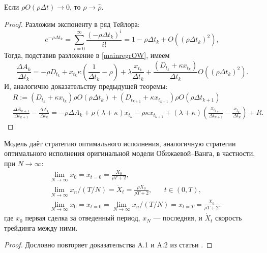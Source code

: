 \begin{appendices}
	\begin{theorem}\label{lilreg}
		Если $\rho O(\rho \Delta t) \rightarrow 0$, то $\rho \rightarrow \hat \rho$.
	\end{theorem}
	\begin{proof}
		Разложим экспоненту в ряд Тейлора:
		\begin{equation*}
			e^{- \rho \Delta t_k} = \sum_{i=0}^{\infty} \frac{(-\rho \Delta t_k)^i}{i!} = 1 - \rho \Delta t_k + O((\rho \Delta t_k)^2),
		\end{equation*}
		Тогда, подставив разложение в \eqref{mainregrOW}, имеем
		\begin{equation*}
			\frac{\Delta A_k}{\Delta t_k} = - \rho D_{t_k}
			+ x_{t_k}  \kappa (\frac{1}{\Delta t_k} -  \rho) + \lambda  \frac{x_{t_k}}{\Delta t_k}
			+ \frac{(D_{t_k} + \kappa x_{t_k})}{\Delta t_k} O((\rho \Delta t_k)^2).
		\end{equation*}
		И, аналогично доказательству предыдущей теоремы:
		\begin{align*}
			 & R := (D_{t_k} + \kappa x_{t_k}) \rho O(\rho \Delta t_k) + (D_{t_{k+1}} + \kappa x_{t_{k+1}}) \rho O(\rho \Delta t_{k+1})                                 \\
			 & \frac{\Delta A_{k+1}}{\Delta t_{k+1}} - \frac{\Delta A_{k}}{\Delta t_{k}} = -\rho \Delta A_k + \rho (\lambda + \kappa) x_{t_k} - \rho \kappa x_{t_{k+1}}
			+ (\lambda + \kappa) \left(\frac{x_{t_{k+1}}}{\Delta t_{k+1}} - \frac{x_{t_k}}{\Delta t_{k}}\right) + R.
		\end{align*}
	\end{proof}

	\begin{theorem}
		Модель даёт стратегию оптимального исполнения, аналогичную стратегии оптимального исполнения
		оригинальной модели Обижаевой--Ванга, в частности, при $N \rightarrow \infty$:
		\begin{align*}
			 & \lim _{N \rightarrow \infty} x_0 = x_{t = 0} = \frac{X_0}{\rho T + 2},                                                      \\
			 & \lim _{N \rightarrow \infty} x_n / (T/N) = \dot X _t = \frac{\rho X_0}{\rho T + 2}, \;\;\;\;\;\; t \in (0, T),              \\
			 & \lim _{N \rightarrow \infty} x_0 = x_{t = 0} = \lim _{N \rightarrow \infty} x_n / (T/N) = x_{t=T}=  \frac{X_0}{\rho T + 2}. %
		\end{align*}
		где $x_0$ первая сделка за отведенный период, $x_N$ --- последняя, и $\dot X _t$ скорость трейдинга между ними.
	\end{theorem}
	\begin{proof}
		Дословно повторяет доказательства A.1 и A.2 из статьи \cite{obizhaeva2013optimal}.
	\end{proof}


\end{appendices}
